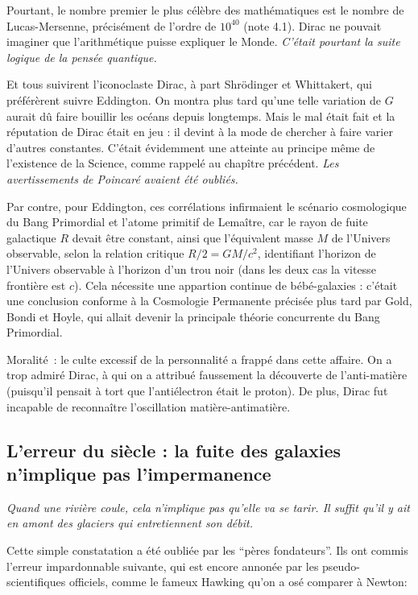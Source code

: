 \documentclass[a4paper,12pt]{article}
\begin{document}
Pourtant, le nombre premier le plus célèbre des mathématiques est le nombre de Lucas-Mersenne, précisément de l'ordre de $10^{40}$ (note 4.1). Dirac ne pouvait imaginer que l'arithmétique puisse expliquer le Monde.\textit{ C'était pourtant la suite logique de la pensée quantique.}

Et tous suivirent l'iconoclaste Dirac, à part Shrödinger et Whittakert, qui préférèrent suivre Eddington. On montra plus tard qu'une telle variation de $G$ aurait dû faire bouillir les océans depuis longtemps. Mais le mal était fait et la réputation de Dirac était en jeu : il devint à la mode de chercher à faire varier d'autres constantes. C'était évidemment une atteinte au principe même de l'existence de la Science, comme rappelé au chapître précédent. \textit{Les avertissements de Poincaré avaient été oubliés.}
     
     Par contre, pour Eddington, ces corrélations infirmaient le scénario cosmologique du Bang Primordial et l'atome primitif de Lemaître, car le rayon de fuite galactique $R$ devait être constant, ainsi que l'équivalent masse $M$ de l'Univers observable, selon la relation critique  $R/2 = GM/c^2$, identifiant l'horizon de l'Univers observable à l'horizon d'un trou noir (dans les deux cas la vitesse frontière est $c$). Cela nécessite une appartion continue de bébé-galaxies : c'était une conclusion conforme à la Cosmologie Permanente précisée plus tard par Gold, Bondi et Hoyle, qui allait devenir la principale théorie concurrente du Bang Primordial. 

Moralité : le culte excessif de la personnalité a frappé dans cette affaire. On a trop admiré Dirac, à qui on a attribué faussement la découverte de l’anti-matière (puisqu’il pensait à tort que l’antiélectron était le proton). De plus, Dirac fut incapable de reconnaître l'oscillation matière-antimatière.


\subsection{L'erreur du siècle : la fuite des galaxies n'implique pas l'impermanence}

    \textit{ Quand une rivière coule, cela n'implique pas qu'elle va se tarir. Il suffit qu'il y ait en amont des glaciers qui entretiennent son débit.}
     

Cette simple constatation a été oubliée par les ``pères fondateurs''. Ils ont commis l'erreur impardonnable suivante, qui est encore annonée par les pseudo-scientifiques officiels, comme le fameux Hawking qu'on a osé comparer à Newton:
\end{document}
